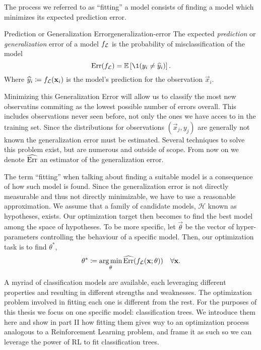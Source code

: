 The process we referred to as ``fitting'' a model consists of finding a model
which minimizes its expected prediction error.

\begin{dfn}{Prediction or Generalization Error}{generalization-error}
    The expected \emph{prediction} or \emph{generalization} error of a model
    $f_{\mathcal{L}}$ is the probability of misclassification of the model
    \begin{equation*}
        \Err (f_\L) = \mathbb{E} \left[ \1 (y_i \neq \widehat{y}_i)  \right].
    \end{equation*}
    Where $\widehat{y}_i \coloneqq f_{\mathcal{L}} (\mathbf{x}_i)$ is the model's prediction
    for the observation $\vec{x}_i$.
\end{dfn}

Minimizing this Generalization Error will allow us to classify the most new
observatins commiting as the lowest possible number of errors overall. This
includes observations never seen before, not only the ones we have acces to in
the training set. Since the distributions for observations $(\vec{x}_j, y_j)$
are generally not known the generalization error must be estimated. Several
techniques to solve this problem exist, but are numerous and outside of scope.
From now on we denote $\widehat{\operatorname*{Err}}$ an estimator of the generalization error.

The term ``fitting'' when talking about finding a suitable model is a
consequence of how such model is found. Since the generalization error is not
directly measurable and thus not directly minimizable, we have to use a
reasonable approximation. We assume that a family of candidate models,
$\mathcal{H}$ known as hypotheses, exists. Our optimization target then becomes
to find the best model among the space of hypotheses. To be more specific, let
$\vec{\theta}$ be the vector of hyper-parameters controlling the behaviour of a
specific model. Then, our optimization task is to find $\theta^{*}$,
\begin{equation*}
    \theta^{*} \coloneqq \operatorname*{arg\,min}_{\theta} \widehat{\operatorname*{Err}}(f_{\mathcal{L}} (\mathbf{x}; \theta)) \quad \forall \mathbf{x}.
\end{equation*}

A myriad of classification models are available, each leveraging different
properties and resulting in different strengths and weaknesses. The optimization
problem involved in fitting each one is different from the rest. For the
purposes of this thesis we focus on one specific model: classification trees. We
introduce them here and show in part II how fitting them gives way to an
optimization process analogous to a Reinforcement Learning problem, and frame it
as such so we can leverage the power of RL to fit classification trees.

